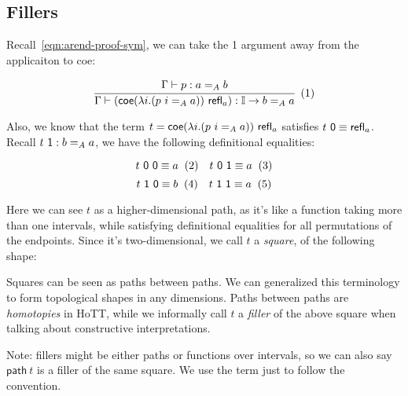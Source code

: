 

\subsection{Fillers}
\label{subsec:fill}

Recall~\ref{eqn:arend-proof-sym}, we can take the \textsf 1 argument away from
the applicaiton to \textsf{coe}:

\[
  \cfrac{
    \Gamma \vdash p : a =_A b
  }{
    \Gamma \vdash (\textsf{coe}
    (\lambda i. (p\ i =_A a)) \ \refl_a)
    : \mathbb I \rightarrow b =_A a
  }
  \xtag \label{eqn:coe-a-b-path-gen-eta}
\]

Also, we know that the term $t = \textsf{coe} (\lambda i. (p\ i =_A a)) \ \textsf{refl}_a$
satisfies $t\ \textsf 0 \equiv \textsf{refl}_a$.
Recall $t\ \textsf 1 : b =_A a$,
we have the following definitional equalities:

\[
  t\ \textsf 0\ \textsf 0 \equiv a \xtag \quad
  t\ \textsf 0\ \textsf 1 \equiv a \xtag
\]
\[
  t\ \textsf 1\ \textsf 0 \equiv b \xtag \quad
  t\ \textsf 1\ \textsf 1 \equiv a \xtag
\]

Here we can see $t$ as a higher-dimensional path,
as it's like a function taking more than one intervals,
while satisfying definitional equalities for all permutations of the endpoints.
Since it's two-dimensional, we call $t$ a \textit{square},
of the following shape:

\begin{center}
\end{center}

Squares can be seen as paths between paths.
We can generalized this terminology to form topological shapes in any dimensions.
Paths between paths are \textit{homotopies} in HoTT,
while we informally call $t$ a \textit{filler} of the above square
when talking about constructive interpretations.

Note: fillers might be either paths or functions over intervals,
so we can also say $\textsf{path} \ t$ is a filler of the same square.
We use the term just to follow the convention.

